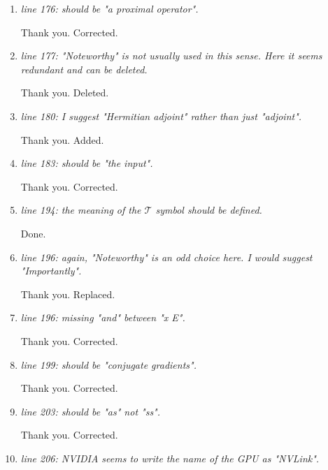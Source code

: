 \documentclass[a4paper,11pt,twoside]{report}
\begin{document}
\begin{enumerate}[resume]
    \item \textit{line 176: should be "a proximal operator".}

    \hspace{1em} Thank you. Corrected.

    \item \textit{line 177: "Noteworthy" is not usually used in this sense. Here it seems redundant and can be deleted.}

    \hspace{1em} Thank you. Deleted.

    \item \textit{line 180: I suggest "Hermitian adjoint" rather than just "adjoint".}

    \hspace{1em} Thank you. Added.

    \item \textit{line 183: should be "the input".}

    \hspace{1em} Thank you. Corrected.

    \item \textit{line 194: the meaning of the $\mathcal{T}$ symbol should be defined.}

    \hspace{1em} Done.

    \item \textit{line 196: again, "Noteworthy" is an odd choice here. I would suggest "Importantly".}

    \hspace{1em} Thank you. Replaced.

    \item \textit{line 196: missing "and" between "x E".}

    \hspace{1em} Thank you. Corrected.

    \item \textit{line 199: should be "conjugate gradients".}

    \hspace{1em} Thank you. Corrected.

    \item \textit{line 203: should be "as" not "ss".}

    \hspace{1em} Thank you. Corrected.

    \item \textit{line 206: NVIDIA seems to write the name of the GPU as "NVLink".}


\end{enumerate}
\end{document}
